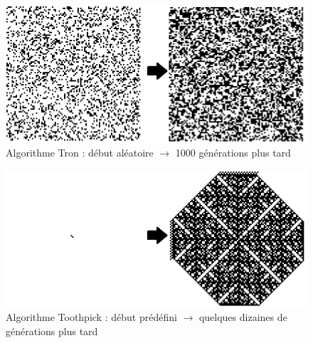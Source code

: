 \begin{figure}[H]
        \center
        \includegraphics[scale=0.5]{images/imgMargolus/TronAvantApres.png}
        \caption{Algorithme Tron : début aléatoire $\rightarrow$ 1000 générations plus tard}
\end{figure}

\begin{figure}[H]
        \center
        \includegraphics[scale=0.5]{images/imgMargolus/ToothpickAvantApres.png}
        \caption{Algorithme Toothpick : début prédéfini $\rightarrow$ quelques dizaines de générations plus tard}
\end{figure}